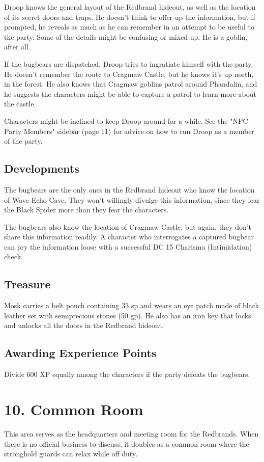 \documentclass[10pt,a4paper,twoside,bg=print,twocolumn,openany,nodeprecatedcode]{dndbook}
\begin{document}
Droop knows the general layout of the Redbrand hideout, as well as the location of its secret doors and traps. He doesn't think to offer up the information, but if prompted, he reveals as much as he can remember in an attempt to be useful to the party. Some of the details might be confusing or mixed up. He is a goblin, after all.

If the bugbears are dispatched, Droop tries to ingratiate himself with the party. He doesn't remember the route to Cragmaw Castle, but he knows it's up north, in the forest. He also knows that Cragmaw goblins patrol around Phandalin, and he suggests the characters might be able to capture a patrol to learn more about the castle.

Characters might be inclined to keep Droop around for a while. See the "NPC Party Members" sidebar (page 11) for advice on how to run Droop as a member of the party.

\subsection{Developments}
The bugbears are the only ones in the Redbrand hideout who know the location of Wave Echo Cave. They won't willingly divulge this information, since they fear the Black Spider more than they fear the characters.

The bugbears also know the location of Cragmaw Castle. but again, they don't share this information readily. A character who interrogates a captured bugbear can pry the information loose with a successful DC 15 Charisma (Intimidation) check.

\subsection{Treasure}
Mosk carries a belt pouch containing 33 sp and wears an eye patch made of black leather set with semiprecious stones (50 gp). He also has an iron key that locks and unlocks all the doors in the Redbrand hideout.

\subsection{Awarding Experience Points}
Divide 600 XP equally among the characters if the party defeats the bugbears.

\section{10. Common Room}
This area serves as the headquarters and meeting room for the Redbrands. When there is no official business to discuss, it doubles as a common room where the stronghold guards can relax while off duty.
\end{document}
